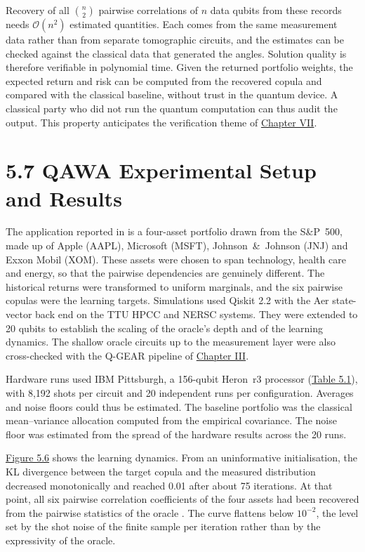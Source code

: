 \documentclass{report}
\theoremstyle{plain}
\theoremstyle{definition}
\theoremstyle{remark}
\newcommand{\bigO}[1]{\mathcal{O}\!\left(#1\right)}
\begin{document}
Recovery of all $\binom{n}{2}$ pairwise correlations of $n$ data qubits from these records needs $\bigO{n^{2}}$ estimated quantities. Each comes from the same measurement data rather than from separate tomographic circuits, and the estimates can be checked against the classical data that generated the angles. Solution quality is therefore verifiable in polynomial time. Given the returned portfolio weights, the expected return and risk can be computed from the recovered copula and compared with the classical baseline, without trust in the quantum device. A classical party who did not run the quantum computation can thus audit the output. This property anticipates the verification theme of \hyperref[ch:qec]{Chapter VII}.

\section{5.7 QAWA Experimental Setup and Results}\label{sec:nisq:qawa-results}

The application reported in \cite{guo2025qawa} is a four-asset portfolio drawn from the S\&P~500, made up of Apple (AAPL), Microsoft (MSFT), Johnson~\&~Johnson (JNJ) and Exxon Mobil (XOM). These assets were chosen to span technology, health care and energy, so that the pairwise dependencies are genuinely different. The historical returns were transformed to uniform marginals, and the six pairwise copulas were the learning targets. Simulations used Qiskit 2.2 with the Aer state-vector back end on the TTU HPCC and NERSC systems. They were extended to 20 qubits to establish the scaling of the oracle's depth and of the learning dynamics. The shallow oracle circuits up to the measurement layer were also cross-checked with the Q-GEAR pipeline of \hyperref[ch:qgear]{Chapter III}.

Hardware runs used IBM Pittsburgh, a 156-qubit Heron~r3 processor (\hyperref[tab:nisq:hw]{Table 5.1}), with 8,192 shots per circuit and 20 independent runs per configuration. Averages and noise floors could thus be estimated. The baseline portfolio was the classical mean--variance allocation computed from the empirical covariance. The noise floor was estimated from the spread of the hardware results across the 20 runs.

\hyperref[fig:nisq:qawa-kl]{Figure 5.6} shows the learning dynamics. From an uninformative initialisation, the KL divergence between the target copula and the measured distribution decreased monotonically and reached 0.01 after about 75 iterations. At that point, all six pairwise correlation coefficients of the four assets had been recovered from the pairwise statistics of the oracle \cite{guo2025qawa}. The curve flattens below $10^{-2}$, the level set by the shot noise of the finite sample per iteration rather than by the expressivity of the oracle.
\end{document}
